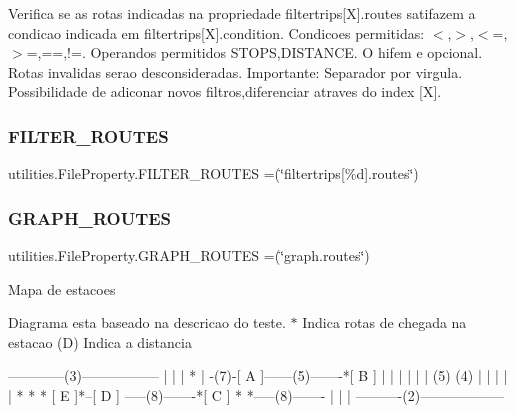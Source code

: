 Verifica se as rotas indicadas na propriedade filtertrips\mbox{[}X\mbox{]}.routes satifazem a condicao indicada em filtertrips\mbox{[}X\mbox{]}.condition. Condicoes permitidas\+: $<$,$>$,$<$=,$>$=,==,!=. Operandos permitidos S\+T\+O\+PS,D\+I\+S\+T\+A\+N\+CE. O hifem e opcional. Rotas invalidas serao desconsideradas. Importante\+: Separador por virgula. Possibilidade de adiconar novos filtros,diferenciar atraves do index \mbox{[}X\mbox{]}. \mbox{\label{enumutilities_1_1_file_property_a86032f5784fe389cae88ea4480bdf0f2}} 
\subsubsection{\texorpdfstring{F\+I\+L\+T\+E\+R\+\_\+\+R\+O\+U\+T\+ES}{FILTER\_ROUTES}}
{\footnotesize\ttfamily utilities.\+File\+Property.\+F\+I\+L\+T\+E\+R\+\_\+\+R\+O\+U\+T\+ES =(\char`\"{}filtertrips\mbox{[}\%d\mbox{]}.routes\char`\"{})}

\mbox{\label{enumutilities_1_1_file_property_a057ee24e5d0a6a4ca1c9dab2fa0103f1}} 
\subsubsection{\texorpdfstring{G\+R\+A\+P\+H\+\_\+\+R\+O\+U\+T\+ES}{GRAPH\_ROUTES}}
{\footnotesize\ttfamily utilities.\+File\+Property.\+G\+R\+A\+P\+H\+\_\+\+R\+O\+U\+T\+ES =(\char`\"{}graph.\+routes\char`\"{})}

Mapa de estacoes

Diagrama esta baseado na descricao do teste. \textquotesingle{}$\ast$\textquotesingle{} Indica rotas de chegada na estacao (D) Indica a distancia \begin{DoxyVerb}  ------------(3)----------------- 
  |                              |
  |                              * 
  | -(7)-[ A ]------(5)-------*[ B ]
  | |      |                     |
  | |     (5)                   (4)
  | |      |                     |
  | *      *                     *
 [ E ]*--[ D ] -----(8)-------*[ C ]
   *          *-----(8)-------   |
   |                             |
   ----------(2)------------------
\end{DoxyVerb}


